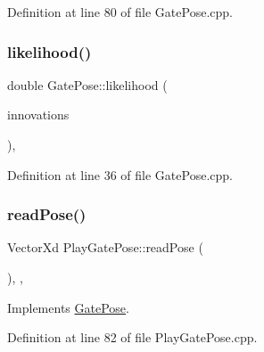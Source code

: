 Definition at line 80 of file Gate\+Pose.\+cpp.

\mbox{\label{classGatePose_a939c575d5d59c8b0f3ab528edd368c0d}} 
\subsubsection{\texorpdfstring{likelihood()}{likelihood()}}
{\footnotesize\ttfamily double Gate\+Pose\+::likelihood (\begin{DoxyParamCaption}\item[{const Eigen\+::\+Ref$<$ const Eigen\+::\+Matrix\+Xf $>$ \&}]{innovations }\end{DoxyParamCaption})\hspace{0.3cm}{\ttfamily [override]}, {\ttfamily [inherited]}}



Definition at line 36 of file Gate\+Pose.\+cpp.

\mbox{\label{classPlayGatePose_a863afa00ea83395e7f2ceffd26242106}} 
\subsubsection{\texorpdfstring{read\+Pose()}{readPose()}}
{\footnotesize\ttfamily Vector\+Xd Play\+Gate\+Pose\+::read\+Pose (\begin{DoxyParamCaption}{ }\end{DoxyParamCaption})\hspace{0.3cm}{\ttfamily [override]}, {\ttfamily [protected]}, {\ttfamily [virtual]}}



Implements \hyperlink{classGatePose_aed9235df850c3ca930f9e43276bf4f62}{Gate\+Pose}.



Definition at line 82 of file Play\+Gate\+Pose.\+cpp.

\mbox{\label{classPlayGatePose_aa9304fb7f500dc947d5e2b5687fa2caf}} 
